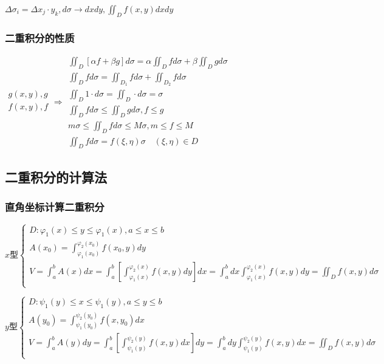 \documentclass[UTF8]{ctexart}
\newcommand{\mt}[1]{\text{#1}}
\newcommand{\mf}[1]{\left( #1\right)}
\newcommand{\mfc}[1]{\left[ #1 \right]}
\newcommand{\q}{\quad}
\newcommand{\p}{\par}
\newcommand{\ma}[1]{\begin{array}{llll} #1 \end{array}}
\newcommand{\fcz}[1] {
    \left\{
        \begin{array}{llll} #1 \end{array}
    \right.
}
\begin{document}
$\Delta \sigma_i=\Delta x_j \cdot y_k,d \sigma \rightarrow dxdy, \iint_D  f\mf{x,y}dxdy$

\subsubsection{二重积分的性质}
$\ma{g\mf{x,y},g\\
    f\mf{x,y},f \\
    }
    \Rightarrow \ma{
    \iint_D \mfc{\alpha f +\beta g }d \sigma=\alpha \iint_D  f  d \sigma +\beta \iint_D  g d \sigma\\
    \iint_D f d \sigma=\iint_{D_1} f d \sigma+\iint_{D_2} f d \sigma\\
    \iint_D 1 \cdot d \sigma=\iint_D  \cdot d \sigma=\sigma\\
    \iint_D  f d \sigma \leqslant \iint_D  g d \sigma ,f \leqslant g\\
    m\sigma \leqslant  \iint_D  f d \sigma \leqslant M\sigma ,m\leqslant f \leqslant M \\
    \iint_D  f d \sigma=f\mf{\xi,\eta}\sigma \q \mf{\xi,\eta} \in D

}$

\subsection{二重积分的计算法}

\subsubsection{直角坐标计算二重积分}
$x\mt{型}\fcz{D:\varphi_1\mf{x}\leqslant y \leqslant\varphi_1\mf{x},a \leqslant x \leqslant b \\
A\mf{x_0}=\int_{\varphi_1\mf{x_0}}^{\varphi_2\mf{x_0}}f\mf{x_0,y}dy\\
V=\int_a^b A\mf{x}dx=\int_a^b \mfc{\int_{\varphi_1\mf{x}}^{\varphi_2\mf{x}}f\mf{x,y}dy}  dx =\int_a^b dx\int_{\varphi_1\mf{x}}^{\varphi_2\mf{x}}f\mf{x,y}dy=\iint_D f\mf{x,y}d\sigma\\
}$\p

$y\mt{型}\fcz{D:\psi_1\mf{y}\leqslant x \leqslant\psi_1\mf{y},a \leqslant y \leqslant b \\
A\mf{y_0}=\int_{\psi_1\mf{y_0}}^{\psi_2\mf{y_0}}f\mf{x,y_0}dx\\
V=\int_a^b A\mf{y}dy=\int_a^b \mfc{\int_{\psi_1\mf{y}}^{\psi_2\mf{y}}f\mf{x,y}dx}  dy =\int_a^b dy\int_{\psi_1\mf{y}}^{\psi_2\mf{y}}f\mf{x,y}dx=\iint_D f\mf{x,y}d\sigma\\
}$
\end{document}
